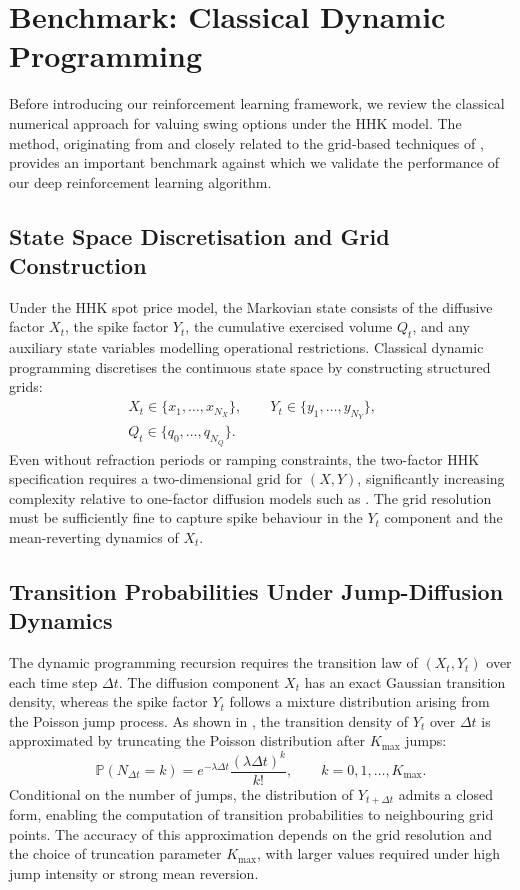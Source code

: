\documentclass[a4paper,fleqn]{cas-dc}
\begin{document}
\section{Benchmark: Classical Dynamic Programming}

Before introducing our reinforcement learning framework, we review the classical numerical approach for valuing swing options under the HHK model. The method, originating from \cite{Hambly2009} and closely related to the grid-based techniques of \cite{jaillet2004valuation,meinshausen2004monte,carmona2004swing}, provides an important benchmark against which we validate the performance of our deep reinforcement learning algorithm.

\subsection{State Space Discretisation and Grid Construction}

Under the HHK spot price model, the Markovian state consists of the diffusive factor \(X_t\), the spike factor \(Y_t\), the cumulative exercised volume \(Q_t\), and any auxiliary state variables modelling operational restrictions. Classical dynamic programming discretises the continuous state space by constructing structured grids:
\begin{align*}
&X_t \in \{x_1,\ldots,x_{N_X}\}, \qquad 
Y_t \in \{y_1,\ldots,y_{N_Y}\}, \qquad\\
&Q_t \in \{q_0,\ldots,q_{N_Q}\}.
\end{align*}
Even without refraction periods or ramping constraints, the two-factor HHK specification requires a two-dimensional grid for \((X,Y)\), significantly increasing complexity relative to one-factor diffusion models such as \cite{lucia2002electricity}. The grid resolution must be sufficiently fine to capture spike behaviour in the \(Y_t\) component and the mean-reverting dynamics of \(X_t\).

\subsection{Transition Probabilities Under Jump-Diffusion Dynamics}

The dynamic programming recursion requires the transition law of \((X_t,Y_t)\) over each time step \(\Delta t\). The diffusion component \(X_t\) has an exact Gaussian transition density, whereas the spike factor \(Y_t\) follows a mixture distribution arising from the Poisson jump process. As shown in \cite{Hambly2009}, the transition density of \(Y_t\) over \(\Delta t\) is approximated by truncating the Poisson distribution after \(K_{\max}\) jumps:
\[
\mathbb{P}(N_{\Delta t}=k)
= e^{-\lambda \Delta t} \frac{(\lambda \Delta t)^k}{k!}, 
\qquad k = 0,1,\ldots,K_{\max}.
\]
Conditional on the number of jumps, the distribution of \(Y_{t+\Delta t}\) admits a closed form, enabling the computation of transition probabilities to neighbouring grid points. The accuracy of this approximation depends on the grid resolution and the choice of truncation parameter \(K_{\max}\), with larger values required under high jump intensity or strong mean reversion.
\end{document}
